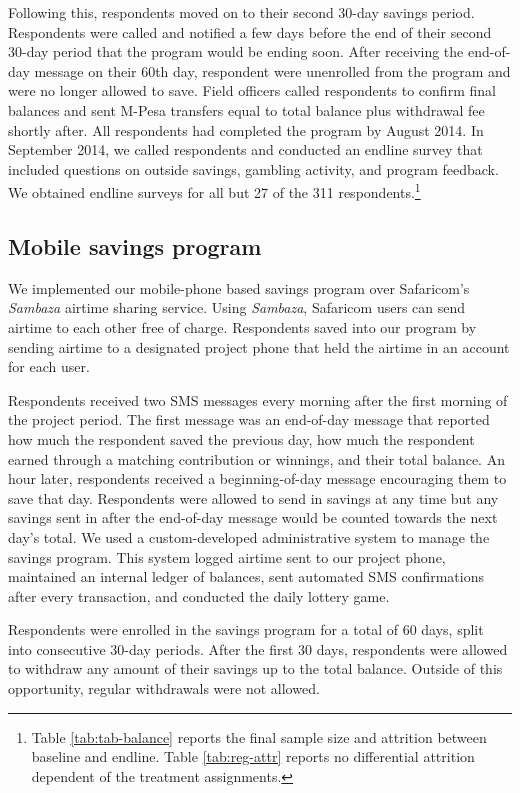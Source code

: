 \documentclass[11pt]{article}
\begin{document}
		Following this, respondents moved on to their second 30-day savings period. Respondents were called and notified a few days before the end of their second 30-day period that the program would be ending soon. After receiving the end-of-day message on their 60th day, respondent were unenrolled from the program and were no longer allowed to save. Field officers called respondents to confirm final balances and sent M-Pesa transfers equal to total balance plus withdrawal fee shortly after. All respondents had completed the program by August 2014. In September 2014, we called respondents and conducted an endline survey that included questions on outside savings, gambling activity, and program feedback. We obtained endline surveys for all but 27 of the 311 respondents.\footnote{Table \ref{tab:tab-balance} reports the final sample size and attrition between baseline and endline. Table \ref{tab:reg-attr} reports no differential attrition dependent of the treatment assignments.}

	\subsection{Mobile savings program}

		We implemented our mobile-phone based savings program over Safaricom's \textit{Sambaza} airtime sharing service. Using \textit{Sambaza}, Safaricom users can send airtime to each other free of charge. Respondents saved into our program by sending airtime to a designated project phone that held the airtime in an account for each user.

		Respondents received two SMS messages every morning after the first morning of the project period. The first message was an end-of-day message that reported how much the respondent saved the previous day, how much the respondent earned through a matching contribution or winnings, and their total balance. An hour later, respondents received a beginning-of-day message encouraging them to save that day. Respondents were allowed to send in savings at any time but any savings sent in after the end-of-day message would be counted towards the next day's total. We used a custom-developed administrative system to manage the savings program. This system logged airtime sent to our project phone, maintained an internal ledger of balances, sent automated SMS confirmations after every transaction, and conducted the daily lottery game.

		Respondents were enrolled in the savings program for a total of 60 days, split into consecutive 30-day periods. After the first 30 days, respondents were allowed to withdraw any amount of their savings up to the total balance. Outside of this opportunity, regular withdrawals were not allowed.
\end{document}
